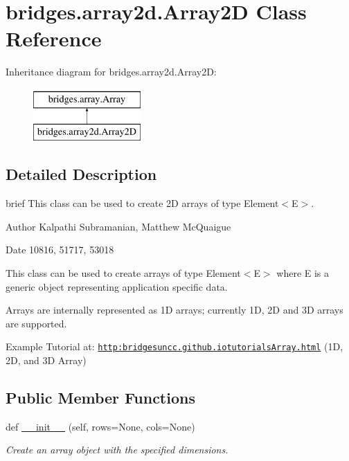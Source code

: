 \hypertarget{classbridges_1_1array2d_1_1_array2_d}{}\section{bridges.\+array2d.\+Array2D Class Reference}
\label{classbridges_1_1array2d_1_1_array2_d}
Inheritance diagram for bridges.\+array2d.\+Array2D\+:\begin{figure}[H]
\begin{center}
\leavevmode
\includegraphics[height=2.000000cm]{classbridges_1_1array2d_1_1_array2_d}
\end{center}
\end{figure}


\subsection{Detailed Description}
brief This class can be used to create 2D arrays of type Element$<$\+E$>$. 

\begin{DoxyAuthor}{Author}
Kalpathi Subramanian, Matthew Mc\+Quaigue
\end{DoxyAuthor}
\begin{DoxyDate}{Date}
10816, 51717, 53018
\end{DoxyDate}
This class can be used to create arrays of type Element$<$\+E$>$ where E is a generic object representing application specific data.

Arrays are internally represented as 1D arrays; currently 1D, 2D and 3D arrays are supported.

Example Tutorial at\+: \href{http:bridgesuncc.github.iotutorialsArray.html}{\tt http\+:bridgesuncc.\+github.\+iotutorials\+Array.\+html} (1D, 2D, and 3D Array)~\newline
 \subsection*{Public Member Functions}
\begin{DoxyCompactItemize}
\item 
def \hyperlink{classbridges_1_1array2d_1_1_array2_d_a8e55f66ed3e8b4f9dd0a6eac578d8c07}{\+\_\+\+\_\+init\+\_\+\+\_\+} (self, rows=None, cols=None)
\begin{DoxyCompactList}\small\item\em Create an array object with the specified dimensions. \end{DoxyCompactList}\end{DoxyCompactItemize}
